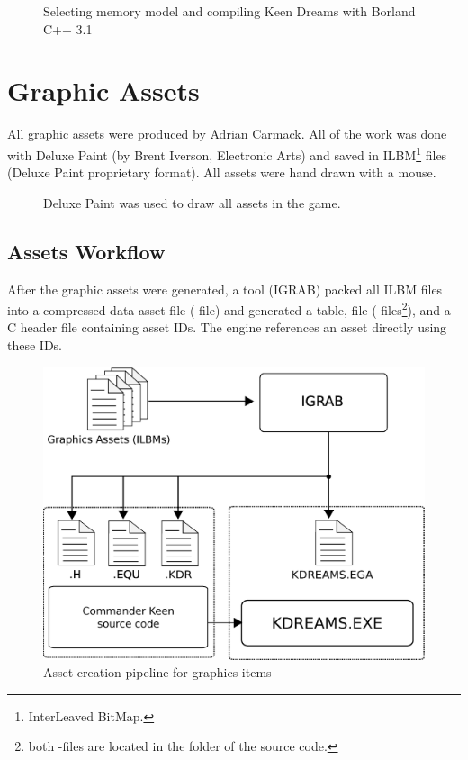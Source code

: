 \documentclass[book.tex]{subfiles}
\begin{document}
\par
\begin{figure}[H]
\centering
  \caption{Selecting memory model and compiling Keen Dreams with Borland C++ 3.1}
\end{figure}


\section{Graphic Assets}
\label{section:graphic_assets}

All graphic assets were produced by Adrian Carmack. All of the work was done with Deluxe Paint (by Brent Iverson, Electronic Arts) and saved in ILBM\footnote{InterLeaved BitMap.} files (Deluxe Paint proprietary format). All assets were hand drawn with a mouse.

\begin{figure}[H]
  \centering
 \caption{Deluxe Paint was used to draw all assets in the game.}
\end{figure}

\pagebreak

\subsection{Assets Workflow}
After the graphic assets were generated, a tool (IGRAB) packed all ILBM files into a compressed data asset file (-file) and generated a  table,  file (-files\footnote{both -files are located in the  folder of the source code.}), and a C header file containing asset IDs. The engine references an asset directly using these IDs.\\


\begin{figure}[H]
\centering
 \includegraphics[width=.9\textwidth]{imgs/drawings/drawing_plain.eps}
 \caption{Asset creation pipeline for graphics items}
 \label{asset-creation-pipeline}
\end{figure}
\end{document}

